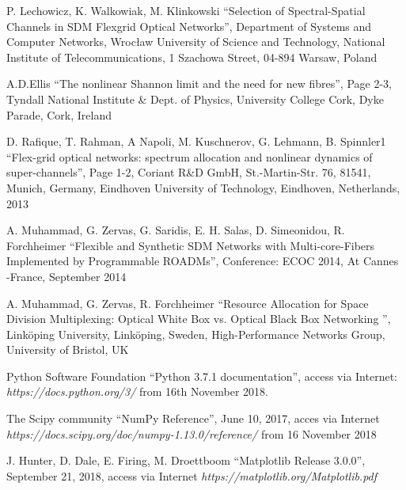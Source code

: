 \documentclass[conference]{IEEEtran}
\begin{document}
\begin{thebibliography}{00}

 P. Lechowicz, K. Walkowiak, M. Klinkowski ``Selection of Spectral-Spatial Channels in SDM
Flexgrid Optical Networks'', Department of Systems and Computer Networks, Wrocław University of Science and Technology, National Institute of Telecommunications, 1 Szachowa Street, 04-894 Warsaw, Poland

 A.D.Ellis ``The nonlinear Shannon limit and the need for new fibres'', Page 2-3, Tyndall National Institute \& Dept. of Physics, University College Cork, Dyke Parade, Cork, Ireland

 D. Rafique, T. Rahman, A Napoli, M. Kuschnerov, G. Lehmann, B. Spinnler1 ``Flex-grid optical networks: spectrum allocation and nonlinear dynamics of super-channels'', Page 1-2, Coriant R\&D GmbH, St.-Martin-Str. 76, 81541, Munich, Germany, Eindhoven University of Technology, Eindhoven, Netherlands, 2013

 A. Muhammad, G. Zervas, G. Saridis, E. H. Salas, D. Simeonidou, R. Forchheimer ``Flexible and Synthetic SDM Networks with Multi-core-Fibers Implemented by Programmable ROADMs'', Conference: ECOC 2014, At Cannes -France, September 2014

 A. Muhammad, G. Zervas, R. Forchheimer ``Resource Allocation for Space Division Multiplexing: Optical White Box vs. Optical Black Box Networking '', Linköping University, Linköping, Sweden, High-Performance Networks Group, University of Bristol, UK

 Python Software Foundation ``Python 3.7.1 documentation'', access via Internet: \textit{https://docs.python.org/3/} from 16th November 2018.

 The Scipy community ``NumPy Reference'', June 10, 2017, acces via Internet \textit{https://docs.scipy.org/doc/numpy-1.13.0/reference/} from 16 November 2018

 J. Hunter, D. Dale, E. Firing, M. Droettboom ``Matplotlib Release 3.0.0'', September 21, 2018, access via Internet \textit{https://matplotlib.org/Matplotlib.pdf}

\end{thebibliography}
\vspace{12pt}
\end{document}
